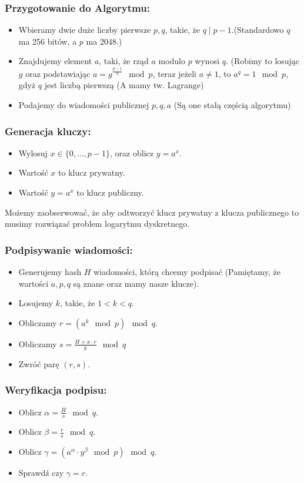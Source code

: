 \subsubsection{Przygotowanie do Algorytmu:}
\begin{itemize}
    \item Wbieramy dwie duże liczby pierwsze $p,q$, takie, że $q \mid p-1$.(Standardowo $q$ ma 256 bitów, a $p$ ma 2048.)
    \item Znajdujemy element $a$, taki, że rząd $a$ modulo $p$ wynosi $q$. (Robimy to losując $g$ oraz podstawiając $a = g^{\frac{p-1}{q}} \mod p$, teraz jeżeli $a \neq 1$, to $a^q = 1 \mod p$, gdyż $q$ jest liczbą pierwszą (A mamy tw. Lagrange)
    \item Podajemy do wiadomości publicznej $p,q,a$ (Są one stałą częścią algorytmu)
\end{itemize}
\subsubsection{Generacja kluczy:}
\begin{itemize}
    \item Wylosuj $x \in \{0,...,p-1\}$, oraz oblicz $y = a^x$.
    \item Wartość $x$ to klucz prywatny.
    \item Wartość $y = a^x$ to klucz publiczny.
\end{itemize}
Możemy zaobserwować, że aby odtworzyć klucz prywatny z klucza publicznego to musimy rozwiązać problem logarytmu dyskretnego.
\subsubsection{Podpisywanie wiadomości:}
\begin{itemize}
    \item Generujemy hash $H$ wiadomości, którą chcemy podpisać (Pamiętamy, że wartości $a,p,q$ są znane oraz mamy nasze klucze).
    \item Losujemy $k$, takie, że $1 < k < q$.
    \item Obliczamy $r = (a^k \mod p) \mod q$.
    \item Obliczamy $s = \frac{H + x\cdot r}{k} \mod q$
    \item Zwróć parę $(r,s)$.
\end{itemize}
\subsubsection{Weryfikacja podpisu:}
\begin{itemize}
    \item Oblicz $\alpha = \frac{H}{s} \mod q$.
    \item Oblicz $\beta = \frac{r}{s} \mod q$.
    \item Oblicz $\gamma = (a^{\alpha}\cdot y^{\beta} \mod p) \mod q$.
    \item Sprawdź czy $\gamma = r$.
\end{itemize}
